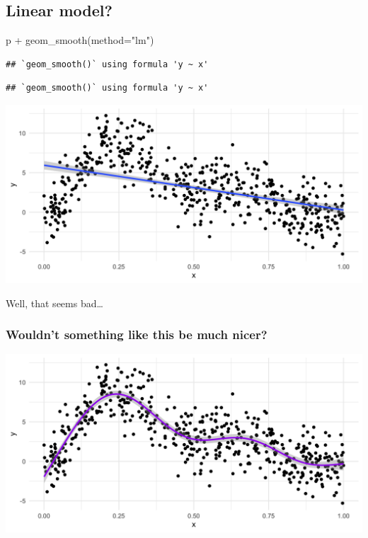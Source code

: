 \documentclass[
  openany]{book}
\newenvironment{Shaded}{\begin{snugshade}}{\end{snugshade}}
\newcommand{\AttributeTok}[1]{\textcolor[rgb]{0.77,0.63,0.00}{#1}}
\newcommand{\FunctionTok}[1]{\textcolor[rgb]{0.00,0.00,0.00}{#1}}
\newcommand{\NormalTok}[1]{#1}
\newcommand{\SpecialCharTok}[1]{\textcolor[rgb]{0.00,0.00,0.00}{#1}}
\newcommand{\StringTok}[1]{\textcolor[rgb]{0.31,0.60,0.02}{#1}}
\begin{document}
\hypertarget{linear-model}{%
\subsection{Linear model?}\label{linear-model}}

\begin{Shaded}
\begin{Highlighting}[]
\NormalTok{p }\SpecialCharTok{+} \FunctionTok{geom\_smooth}\NormalTok{(}\AttributeTok{method=}\StringTok{"lm"}\NormalTok{)}
\end{Highlighting}
\end{Shaded}

\begin{verbatim}
## `geom_smooth()` using formula 'y ~ x'
\end{verbatim}

\begin{verbatim}
## `geom_smooth()` using formula 'y ~ x'
\end{verbatim}

\begin{center}\includegraphics[width=0.8\linewidth]{images/m5/linear} \end{center}

Well, that seems bad\ldots{}

\hypertarget{wouldnt-something-like-this-be-much-nicer}{%
\subsubsection{Wouldn't something like this be much nicer?}\label{wouldnt-something-like-this-be-much-nicer}}

\begin{center}\includegraphics[width=0.8\linewidth]{images/m5/nicer} \end{center}
\end{document}
